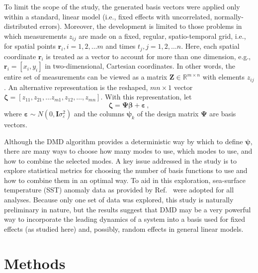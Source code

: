 \documentclass[review,number,sort&compress,12pt]{elsarticle}
\begin{document}
To limit the scope of the study, the generated basis vectors were applied only within a standard, linear model (i.e., fixed effects with uncorrelated, normally-distributed errors). Moreover, the development is limited to those problems in which measurements $z_{ij}$ are made on a fixed, regular, spatio-temporal grid, i.e., for spatial points $\mathbf{r}_i, i = 1, 2, \ldots m$ and times $t_j, j = 1, 2, \ldots n$. 
Here, each spatial coordinate $\mathbf{r}_i$ is treated as a vector to account for more than one dimension, e.g., $\mathbf{r}_i = [x_i, y_i]$ in two-dimensional, Cartesian coordinates.
In other words, the entire set of measurements can be viewed as a matrix $\mathbf{Z} \in \mathbb{R}^{m\times n}$ with elements $z_{ij}$. 
An alternative representation is the reshaped, $mn \times 1$ vector $\boldsymbol{\zeta} = [z_{11}, z_{21}, \ldots z_{m1}, z_{12}, \ldots, z_{mn}]$.
With this representation, let
\begin{equation}
 \boldsymbol{\zeta} = \boldsymbol{\Psi}\boldsymbol{\beta} + \boldsymbol{\varepsilon} \, ,
\end{equation}
where $\boldsymbol{\varepsilon} \sim N(0, \mathbf{I}\sigma^2_{\varepsilon})$ and the columns $\boldsymbol{\psi}_k$ of the design matrix $\boldsymbol{\Psi}$ are basis vectors.

Although the DMD algorithm provides a deterministic way by which to define $\mathbf{\psi}$, there are many ways to choose how many modes to use, which modes to use, and how to combine the selected modes.
A key issue addressed in the study is to explore statistical metrics for choosing the number of basis functions to use and how to combine them in an optimal way.
To aid in this exploration, sea-surface temperature (SST) anomaly data as provided by Ref.~\cite{wikle2019sts} were adopted for all analyses.
Because only one set of data was explored, this study is naturally preliminary in nature, but the results suggest that DMD may be a very powerful way to incorporate the leading dynamics of a system into a basis used for fixed effects (as studied here) and, possibly, random effects in general linear models.


\section{Methods}
\label{sec:methods}
\end{document}
